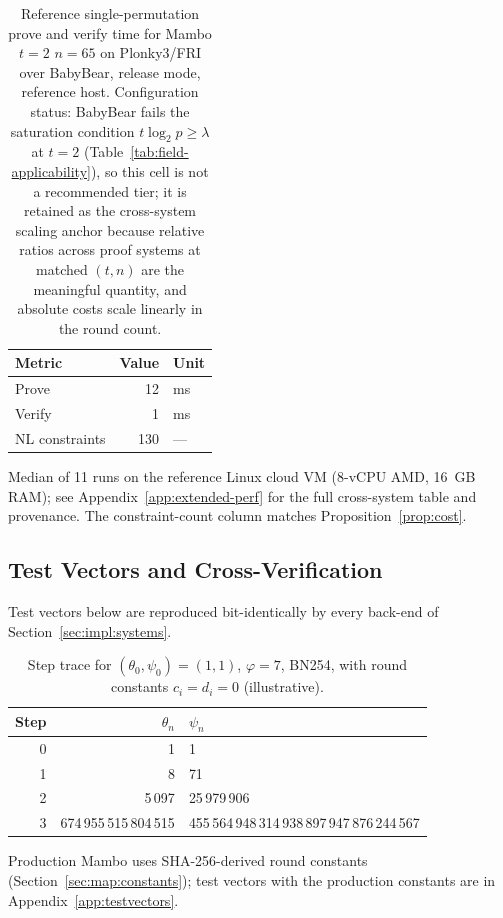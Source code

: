 \documentclass[11pt,a4paper]{article}
\theoremstyle{definition}
\begin{document}
\begin{table}[!htbp]
\centering
\caption{Reference single-permutation prove and verify time for Mambo
$t=2$ $n=65$ on Plonky3/FRI over BabyBear, release mode, reference
host. Configuration status: BabyBear fails the saturation condition
$t \log_2 p \ge \lambda$ at $t=2$
(Table~\ref{tab:field-applicability}), so this cell is not a
recommended tier; it is retained as the cross-system scaling anchor
because relative ratios across proof systems at matched $(t, n)$ are
the meaningful quantity, and absolute costs scale linearly in the
round count.}
\label{tab:perf-anchor}
\small
\begin{tabular}{@{}lrl@{}}
\toprule
Metric & Value & Unit \\
\midrule
Prove           & 12  & ms \\
Verify          & 1   & ms \\
NL constraints  & 130 & --- \\
\bottomrule
\end{tabular}
\smallskip

\footnotesize
Median of 11 runs on the reference Linux cloud VM (8-vCPU AMD, 16~GB
RAM); see Appendix~\ref{app:extended-perf} for the full cross-system
table and provenance. The constraint-count column matches
Proposition~\ref{prop:cost}.
\end{table}

\FloatBarrier


\subsection{Test Vectors and Cross-Verification}\label{sec:impl:testvectors}

Test vectors below are reproduced bit-identically by every back-end of
Section~\ref{sec:impl:systems}.

\begin{table}[h]
\centering
\caption{Step trace for $(\theta_0, \psi_0) = (1,1)$, $\varphi = 7$, BN254,
with round constants $c_i = d_i = 0$ (illustrative).}
\label{tab:steptrace}
\begin{tabular}{@{}rrl@{}}
\toprule
Step & $\theta_n$ & $\psi_n$ \\
\midrule
0 & 1 & 1 \\
1 & 8 & 71 \\
2 & 5\,097 & 25\,979\,906 \\
3 & 674\,955\,515\,804\,515 & 455\,564\,948\,314\,938\,897\,947\,876\,244\,567 \\
\bottomrule
\end{tabular}
\smallskip

\footnotesize
Production Mambo uses SHA-256-derived round constants
(Section~\ref{sec:map:constants}); test vectors with the production
constants are in Appendix~\ref{app:testvectors}.
\end{table}
\end{document}

